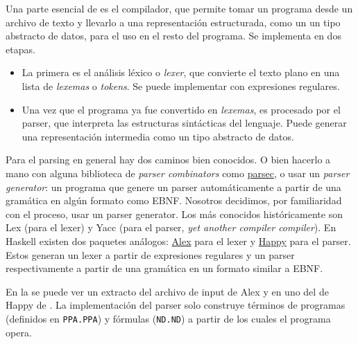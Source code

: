 Una parte esencial de \ppaTool{} es el compilador, que permite tomar un programa
desde un archivo de texto y llevarlo a una representación estructurada, como un
un tipo abstracto de datos, para el uso en el resto del programa. Se implementa
en dos etapas.

\begin{itemize}
    \item La primera es el análisis léxico o \textit{lexer}, que convierte el
    texto plano en una lista de \textit{lexemas} o \textit{tokens}. Se puede
    implementar con expresiones regulares.
    \item Una vez que el programa ya fue convertido en \textit{lexemas}, es
    procesado por el parser, que interpreta las estructuras sintácticas del
    lenguaje. Puede generar una representación intermedia como un tipo abstracto
    de datos.
\end{itemize}

Para el parsing en general hay dos caminos bien conocidos. O bien hacerlo a mano
con alguna biblioteca de \textit{parser combinators} como
\href{https://hackage.haskell.org/package/parsec}{parsec}, o usar un
\textit{parser generator}: un programa que genere un parser automáticamente a
partir de una gramática en algún formato como EBNF. Nosotros decidimos, por
familiaridad con el proceso, usar un parser generator. Los más conocidos
históricamente son Lex (para el lexer) y Yacc (para el parser, \textit{yet
another compiler compiler}). En Haskell existen dos paquetes análogos: \href{https://hackage.haskell.org/package/alex}{Alex} para el
lexer y \href{https://hackage.haskell.org/package/happy}{Happy} para el parser.
Estos generan un lexer a partir de expresiones regulares y un parser
respectivamente a partir de una gramática en un formato similar a EBNF.

En la  se puede ver un extracto del archivo de
input de Alex y en  uno del de Happy de
\ppaTool{}. La implementación del parser solo construye términos de programas
(definidos en \texttt{PPA.PPA}) y fórmulas (\texttt{ND.ND}) a partir de los
cuales el programa opera.

